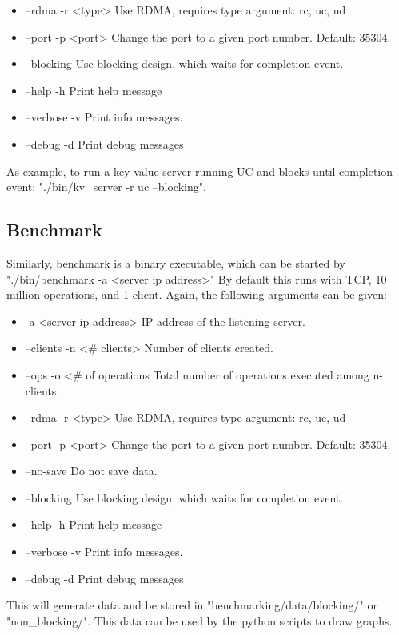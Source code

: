 \begin{itemize}
    \item --rdma -r <type> Use RDMA, requires type argument: rc, uc, ud
    \item --port -p <port> Change the port to a given port number. Default: 35304.
    \item --blocking Use blocking design, which waits for completion event.
    \item --help -h Print help message
    \item --verbose -v Print info messages.
    \item --debug -d Print debug messages
\end{itemize}

As example, to run a key-value server running UC and blocks until completion event: "./bin/kv\_server -r uc --blocking".

\subsection{Benchmark}
Similarly, benchmark is a binary executable, which can be started by "./bin/benchmark -a <server ip address>"
By default this runs with TCP, 10 million operations, and 1 client.
Again, the following arguments can be given:
\begin{itemize}
    \item -a <server ip address> IP address of the listening server.
    \item --clients -n <\# clients> Number of clients created.
    \item --ops -o <\# of operations Total number of operations executed among n-clients.
    \item --rdma -r <type> Use RDMA, requires type argument: rc, uc, ud
    \item --port -p <port> Change the port to a given port number. Default: 35304.
    \item --no-save Do not save data.
    \item --blocking Use blocking design, which waits for completion event.
    \item --help -h Print help message
    \item --verbose -v Print info messages.
    \item --debug -d Print debug messages
\end{itemize}

This will generate data and be stored in "benchmarking/data/blocking/" or "non\_blocking/".
This data can be used by the python scripts to draw graphs.

